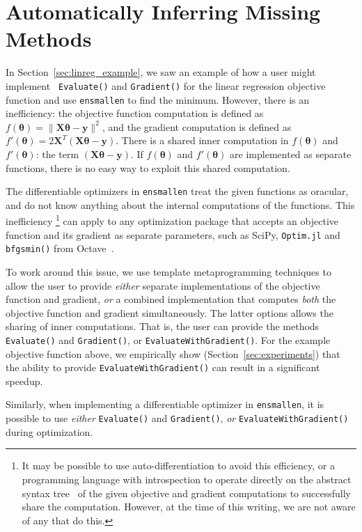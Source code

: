 \section{Automatically Inferring Missing Methods}
\label{sec:automatic}

In Section~\ref{sec:linreg_example}, we saw an example of how a user might implement {\tt
Evaluate()} and {\tt Gradient()} for the linear regression objective function
and use {\tt ensmallen} to find the minimum.
However, there is an inefficiency:
the objective function computation is defined as $f(\bm \theta) = \| \bm X \bm \theta - \bm y \|^2$,
and the gradient computation is defined as $f'(\bm \theta) = 2 \bm X^T (\bm X \bm \theta - \bm y)$.
There is a shared inner computation in $f(\bm \theta)$ and $f'(\bm \theta)$: the
term $(\bm X \bm \theta - \bm y)$.
If $f(\bm \theta)$ and $f'(\bm \theta)$ are implemented as separate functions,
there is no easy way to exploit this shared computation.

The differentiable optimizers in {\tt ensmallen} treat the given functions as oracular,
and do not know anything about the internal computations of the functions.
This inefficiency%
\footnote
  {It may be possible to use auto-differentiation to avoid this efficiency,
  or a programming language with introspection to operate directly on the
  abstract syntax tree~\cite{TODO}  of the given objective and gradient
  computations to successfully share the computation.  However, at the time of
  this writing, we are not aware of any that do this.
  }
can apply to any optimization package that accepts an objective
function and its gradient as separate parameters,
such as SciPy, {\tt Optim.jl} and {\tt bfgsmin()} from Octave~\cite{TODO}.

To work around this issue, we use template metaprogramming techniques to allow
the user to provide {\it either} separate implementations of the objective
function and gradient, {\it or} a combined implementation that computes {\it
both} the objective function and gradient simultaneously.
The latter options allows the sharing of inner computations.
That is, the user can provide the methods {\tt Evaluate()} and {\tt Gradient()},
or {\tt EvaluateWithGradient()}.
For the example objective function above,
we empirically show (Section~\ref{sec:experiments}) that the ability to provide
{\tt EvaluateWithGradient()} can result in a significant speedup.

Similarly, when implementing a differentiable optimizer in {\tt ensmallen},
it is possible to use {\it either} {\tt Evaluate()} and {\tt Gradient()},
{\it or} {\tt EvaluateWithGradient()} during optimization.

